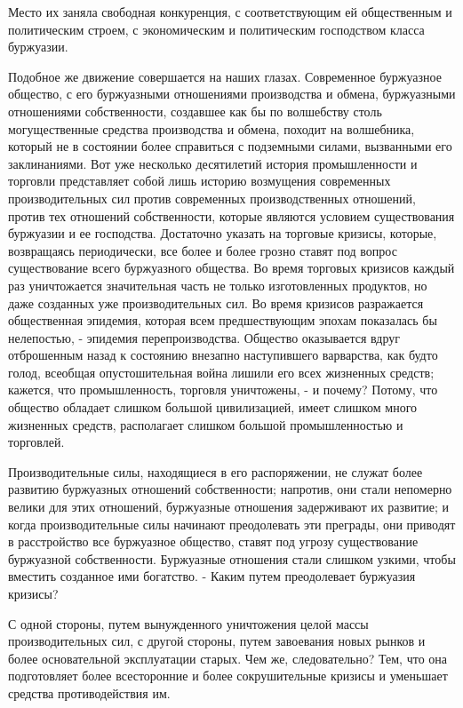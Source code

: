 \documentclass[12pt]{article}
\newcommand{\parnum}{(\arabic{parcount})}
\newcounter{parcount}
\newenvironment{parnumbers}{%
  \par%
  \everypar{\noindent \stepcounter{parcount}\marginpar[]{\parnum}}%
}{}
\begin{document}
\begin{parnumbers}
    Место их заняла свободная конкуренция, с соответствующим ей общественным и политическим строем, с экономическим и политическим господством класса буржуазии.

    Подобное же движение совершается на наших глазах. Современное буржуазное общество, с его буржуазными отношениями производства и обмена, буржуазными отношениями собственности, создавшее как бы по волшебству столь могущественные средства производства и обмена, походит на волшебника, который не в состоянии более справиться с подземными силами, вызванными его заклинаниями. Вот уже несколько десятилетий история промышленности и торговли представляет собой лишь историю возмущения современных производительных сил против современных производственных отношений, против тех отношений собственности, которые являются условием существования буржуазии и ее господства. Достаточно указать на торговые кризисы, которые, возвращаясь периодически, все более и более грозно ставят под вопрос существование всего буржуазного общества. Во время торговых кризисов каждый раз уничтожается значительная часть не только изготовленных продуктов, но даже созданных уже производительных сил. Во время кризисов разражается общественная эпидемия, которая всем предшествующим эпохам показалась бы нелепостью, - эпидемия перепроизводства. Общество оказывается вдруг отброшенным назад к состоянию внезапно наступившего варварства, как будто голод, всеобщая опустошительная война лишили его всех жизненных средств; кажется, что промышленность, торговля уничтожены, - и почему? Потому, что общество обладает слишком большой цивилизацией, имеет слишком много жизненных средств, располагает слишком большой промышленностью и торговлей.

    Производительные силы, находящиеся в его распоряжении, не служат более развитию буржуазных отношений собственности; напротив, они стали непомерно велики для этих отношений, буржуазные отношения задерживают их развитие; и когда производительные силы начинают преодолевать эти преграды, они приводят в расстройство все буржуазное общество, ставят под угрозу существование буржуазной собственности. Буржуазные отношения стали слишком узкими, чтобы вместить созданное ими богатство. - Каким путем преодолевает буржуазия кризисы?

    С одной стороны, путем вынужденного уничтожения целой массы производительных сил, с другой стороны, путем завоевания новых рынков и более основательной эксплуатации старых. Чем же, следовательно? Тем, что она подготовляет более всесторонние и более сокрушительные кризисы и уменьшает средства противодействия им.


\end{parnumbers}
\end{document}
